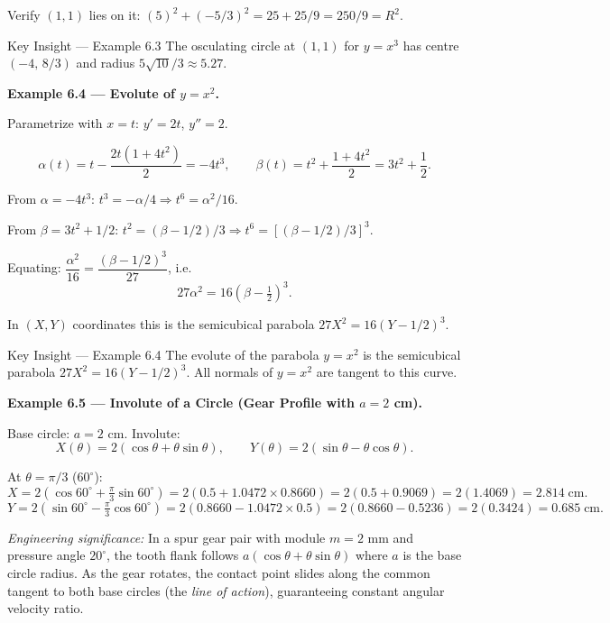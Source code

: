 \documentclass[12pt,a4paper]{article}
\begin{document}
Verify $(1,1)$ lies on it: $(5)^{2} + (-5/3)^{2} = 25 + 25/9 = 250/9 = R^{2}$. \checkmark

\begin{learnbox}{Key Insight --- Example 6.3}
The osculating circle at $(1,1)$ for $y=x^3$ has centre $(-4,\,8/3)$ and radius $5\sqrt{10}/3 \approx 5.27$.
\end{learnbox}

\bigskip
\textbf{Example 6.4 --- Evolute of $y = x^2$.}

Parametrize with $x = t$: $y' = 2t$, $y'' = 2$.

\[
  \alpha(t) = t - \frac{2t(1+4t^{2})}{2} = -4t^{3}, \qquad \beta(t) = t^{2} + \frac{1+4t^{2}}{2} = 3t^{2}+\frac{1}{2}.
\]

From $\alpha = -4t^{3}$: $t^{3} = -\alpha/4 \Rightarrow t^{6} = \alpha^{2}/16$.

From $\beta = 3t^{2}+1/2$: $t^{2} = (\beta-1/2)/3 \Rightarrow t^{6} = [(\beta-1/2)/3]^{3}$.

Equating: $\dfrac{\alpha^{2}}{16} = \dfrac{(\beta-1/2)^{3}}{27}$, i.e.\
\[
  \boxed{27\alpha^{2} = 16\!\left(\beta - \tfrac{1}{2}\right)^{3}.}
\]

In $(X,Y)$ coordinates this is the semicubical parabola $27X^{2} = 16(Y-1/2)^{3}$.

\begin{learnbox}{Key Insight --- Example 6.4}
The evolute of the parabola $y=x^2$ is the semicubical parabola $27X^2=16(Y-1/2)^3$. All normals of $y=x^2$ are tangent to this curve.
\end{learnbox}

\bigskip
\textbf{Example 6.5 --- Involute of a Circle (Gear Profile with $a = 2$ cm).}

Base circle: $a = 2$ cm. Involute:
\[
  X(\theta) = 2(\cos\theta + \theta\sin\theta), \qquad Y(\theta) = 2(\sin\theta - \theta\cos\theta).
\]

At $\theta = \pi/3$ ($60^{\circ}$):
\[
  X = 2\!\left(\cos 60^{\circ} + \tfrac{\pi}{3}\sin 60^{\circ}\right) = 2\!\left(0.5 + 1.0472\times 0.8660\right) = 2(0.5 + 0.9069) = 2(1.4069) = 2.814\;\text{cm}.
\]
\[
  Y = 2\!\left(\sin 60^{\circ} - \tfrac{\pi}{3}\cos 60^{\circ}\right) = 2(0.8660 - 1.0472\times 0.5) = 2(0.8660-0.5236) = 2(0.3424) = 0.685\;\text{cm}.
\]

\textit{Engineering significance:} In a spur gear pair with module $m = 2$ mm and pressure angle $20^{\circ}$, the tooth flank follows $a(\cos\theta+\theta\sin\theta)$ where $a$ is the base circle radius. As the gear rotates, the contact point slides along the common tangent to both base circles (the \emph{line of action}), guaranteeing constant angular velocity ratio.
\end{document}
